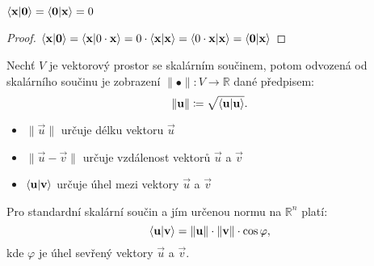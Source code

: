 \begin{observation}
    $\langle \mathbf{x} | \mathbf{0} \rangle = \langle \mathbf{0} | \mathbf{x} \rangle = 0$
\end{observation}

\begin{proof}
    $\langle \mathbf{x} | \mathbf{0} \rangle = \langle \mathbf{x} | 0 \cdot \mathbf{x} \rangle = 0 \cdot \langle \mathbf{x} | \mathbf{x} \rangle
    = \langle 0\cdot \mathbf{x} | \mathbf{x} \rangle = \langle \mathbf{0} | \mathbf{x} \rangle$
\end{proof}

\begin{definition}
    \label{def:normaskalarnisoucin}
    Nechť $V$ je vektorový prostor se skalárním součinem, potom
     odvozená od skalárního součinu je zobrazení
    $\|\bullet\|: V \rightarrow \mathbb{R}$ dané předpisem:
    $$\|\mathbf{u}\| \coloneqq \sqrt{\langle \mathbf{u} | \mathbf{u} \rangle}.$$
\end{definition}

\begin{remark}
    \leavevmode
    \begin{itemize}
        \item $\|\vec{u}\|$ určuje délku vektoru $\vec{u}$
        \item $\|\vec{u} - \vec{v}\|$ určuje vzdálenost vektorů
            $\vec{u}$ a $\vec{v}$
        \item $\langle \mathbf{u} | \mathbf{v} \rangle$ určuje úhel mezi vektory
            $\vec{u}$ a $\vec{v}$
    \end{itemize}
\end{remark}

\begin{observation}
    Pro standardní skalární součin a jím určenou normu na 
    $\mathbb{R}^n$ platí: 
    $$ \langle \mathbf{u} | \mathbf{v} \rangle = \|\mathbf{u}\|\cdot\|\mathbf{v}\|\cdot \cos 
    \varphi,$$
    kde $\varphi$ je úhel sevřený vektory $\vec{u}$ a $\vec{v}$.
\end{observation}

